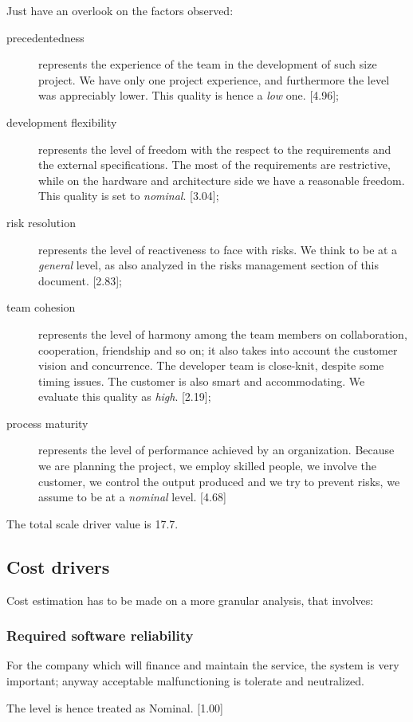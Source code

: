 \documentclass{scrreprt}
\begin{document}
Just have an overlook on the factors observed:
\begin{description}
\item[precedentedness] represents the experience of the team in the development of such size project. We have only one project experience, and furthermore the level was appreciably lower. This quality is hence a \emph{low} one. [4.96];
\item[development flexibility] represents the level of freedom with the respect to the requirements and the external specifications. The most of the requirements are restrictive, while on the hardware and architecture side we have a reasonable freedom. This quality is set to \emph{nominal}. [3.04];
\item[risk resolution] represents the level of reactiveness to face with risks. We think to be at a \emph{general} level, as also analyzed in the risks management section of this document. [2.83];
\item[team cohesion] represents the level of harmony among the team members on collaboration, cooperation, friendship and so on; it also takes into account the customer vision and concurrence. The developer team is close-knit, despite some timing issues. The customer is also smart and accommodating. We evaluate this quality as \emph{high}. [2.19];
\item[process maturity] represents the level of performance achieved by an organization. Because we are planning the project, we employ skilled people, we involve the customer, we control the output produced and we try to prevent risks, we assume to be at a \emph{nominal} level. [4.68]
\end{description}

The total scale driver value is 17.7.


\subsection{Cost drivers}
Cost estimation has to be made on a more granular analysis, that involves:

\subsubsection{Required software reliability}
For the company which will finance and maintain the service, the system is very important; anyway acceptable malfunctioning is tolerate and neutralized.

The level is hence treated as Nominal. [1.00]
\end{document}
